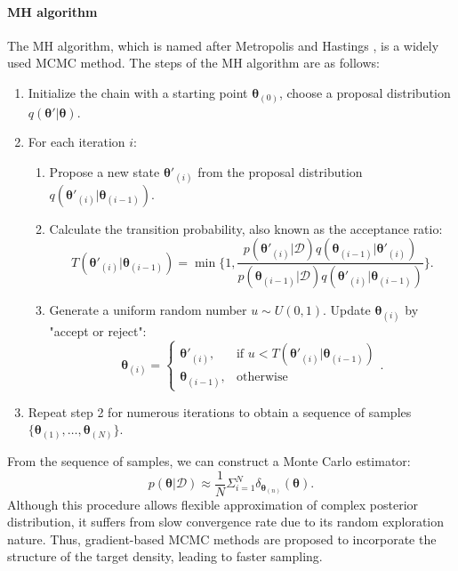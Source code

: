 \paragraph{\acf{MH} algorithm}
The \ac{MH} algorithm, which is named after Metropolis \citeyearpar{Metropolis} and Hastings \citeyearpar{Hastings}, is a widely used \ac{MCMC} method. The steps of the \ac{MH} algorithm are as follows:
\begin{enumerate}
    \item Initialize the chain with a starting point $\boldsymbol{\theta}_{(0)}$, choose a proposal distribution $q(\boldsymbol{\theta}'|\boldsymbol{\theta})$. 
    \item For each iteration $i$:
    \begin{enumerate}
        \item Propose a new state $\boldsymbol{\theta}'_{(i)}$ from the proposal distribution $q(\boldsymbol{\theta}'_{(i)}|\boldsymbol{\theta}_{(i-1)})$.             
        \item Calculate the transition probability, also known as the acceptance ratio: 
        \begin{equation}
        \label{eq:mh_transition}
        T(\boldsymbol{\theta}'_{(i)}|\boldsymbol{\theta}_{(i-1)})=\min\{1, \frac{p(\boldsymbol{\theta}'_{(i)}|\mathcal{D})q(\boldsymbol{\theta}_{(i-1)}|\boldsymbol{\theta}'_{(i)})}{p(\boldsymbol{\theta}_{(i-1)}|\mathcal{D})q(\boldsymbol{\theta}'_{(i)}|\boldsymbol{\theta}_{(i-1)})}\}.
        \end{equation}
        \item Generate a uniform random number $u \sim U(0,1)$. Update $\boldsymbol{\theta}_{(i)}$ by "accept or reject":
        \begin{equation}
            \label{eq:mh_update}
        \boldsymbol{\theta}_{(i)} = \begin{cases} \boldsymbol{\theta}'_{(i)}, & \text{if } u < T(\boldsymbol{\theta}'_{(i)}|\boldsymbol{\theta}_{(i-1)}) \\ \boldsymbol{\theta}_{(i-1)}, & \text{otherwise} \end{cases}.
        \end{equation} 
    \end{enumerate}
    \item Repeat step 2 for numerous iterations to obtain a sequence of samples $\{\boldsymbol{\theta}_{(1)}, \ldots, \boldsymbol{\theta}_{(N)}\}$.
\end{enumerate}
From the sequence of samples, we can construct a Monte Carlo estimator:
\begin{equation}
    p(\boldsymbol{\theta}| \mathcal{D}) \approx \frac{1}{N} \Sigma_{i=1}^{N} \delta_{\boldsymbol{\theta}_{(n)}}(\boldsymbol{\theta}).
\end{equation}
Although this procedure allows flexible approximation of complex posterior distribution, it suffers from slow convergence rate due to its random exploration nature. Thus, gradient-based \ac{MCMC} methods are proposed to incorporate the structure of the target density, leading to faster sampling.

